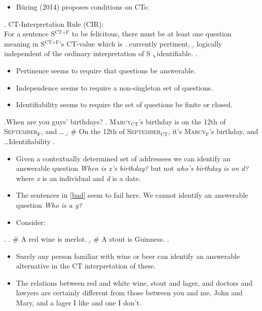 \documentclass[a4paper]{article}
\begin{document}
\begin{itemize}
  \item B\"uring (2014) proposes conditions on CTs:
\end{itemize}
\ex. CT-Interpretation Rule (CIR):\\
For a sentence S$^\text{CT+F}$ to be felicitous, there must be at least one question meaning in S$^\text{CT+F}$’s CT-value which is
\a. currently pertinent,
\b. logically independent of the ordinary interpretation of S
\c. identifiable.
\z.

\begin{itemize}
  \item Pertinence seems to require that questions be answerable.
  \item Independence seems to require a non-singleton set of questions.
  \item Identifiability seems to require the set of questions be finite or closed.
\end{itemize}
\ex.When are you guys' birthdays?
\a. \textsc{Marcy}$_\text{CT}$’s birthday is on the 12th of \textsc{September}$_\text{F}$, and \dots
\b. \# On the 12th of \textsc{September}$_\text{CT}$, it's \textsc{Marcy}$_\text{F}$'s birthday, and \dots \hfill *Identifiability
\z.

\begin{itemize}
  \item Given a contextually determined set of addressees we can identify an answerable question \textit{When is x's birthday?} but not \textit{who's birthday is on d?} where \textit{x} is an individual and \textit{d} is a date.
  \item The sentences in \ref{bad} seem to fail here. We cannot identify an answerable question \textit{Who is a y?}
  \item Consider:
\end{itemize}
\ex.
\a. \# A red wine is merlot.
\b. \# A stout is Guinness.
\z.

\begin{itemize}
  \item Surely any person familiar with wine or beer can identify an answerable alternative in the CT interpretation of these.
  \item The relations between red and white wine, stout and lager, and doctors and lawyers are certainly different from those between you and me, John and Mary, and a lager I like and one I don't.

\end{itemize}
\end{document}
